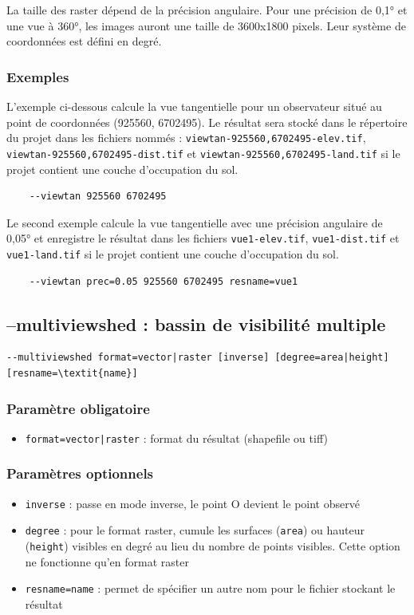\documentclass{report}
\begin{document}
La taille des raster dépend de la précision angulaire. Pour une précision de 0,1° et une vue à 360°, les images auront une taille de 3600x1800 pixels. Leur système de coordonnées est défini en degré. 

\subsubsection{Exemples}
L'exemple ci-dessous calcule la vue tangentielle pour un observateur situé au point de coordonnées (925560, 6702495). Le résultat sera stocké dans le répertoire du projet dans les fichiers nommés : \verb|viewtan-925560,6702495-elev.tif|, \verb|viewtan-925560,6702495-dist.tif| et \verb|viewtan-925560,6702495-land.tif| si le projet contient une couche d'occupation du sol.
\begin{Verbatim}
	--viewtan 925560 6702495
\end{Verbatim}

Le second exemple calcule la vue tangentielle avec une précision angulaire de 0,05° et enregistre le résultat dans les fichiers \verb|vue1-elev.tif|, \verb|vue1-dist.tif| et \verb|vue1-land.tif| si le projet contient une couche d'occupation du sol.
\begin{Verbatim}
	--viewtan prec=0.05 925560 6702495 resname=vue1
\end{Verbatim}


\subsection{--multiviewshed : bassin de visibilité multiple}
\begin{Verbatim}[commandchars=\\\{\}]
--multiviewshed format=vector|raster [inverse] [degree=area|height] [resname=\textit{name}]
\end{Verbatim}

\subsubsection{Paramètre obligatoire}
\begin{itemize}
	\item \verb/format=vector|raster/ : format du résultat (shapefile ou tiff)
\end{itemize}

\subsubsection{Paramètres optionnels}
\begin{itemize}
	\item \verb|inverse| : passe en mode inverse, le point O devient le point observé
	\item \verb|degree| : pour le format raster, cumule les surfaces (\verb|area|) ou hauteur (\verb|height|) visibles en degré au lieu du nombre de points visibles. Cette option ne fonctionne qu'en format raster
	\item \verb|resname=name| : permet de spécifier un autre nom pour le fichier stockant le résultat
\end{itemize}
\end{document}
